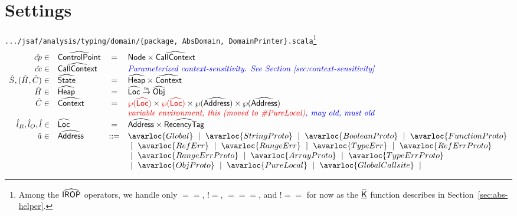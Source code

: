 \newpage
\section{Settings}
{\inblue\tt .../jsaf/analysis/typing/domain/\{package, AbsDomain, DomainPrinter\}.scala}\footnote{
Among the $\widehat{\mbox{\textsf{IROP}}}$ operators, we handle only $==$, $!=$, $===$, and $!==$
for now as the $\widehat{\underline{\sf K}}$ function describes in Section~\ref{sec:abs-helper}.}\\
\[
\begin{array}{rlcl}
\acp \in & \aControlPoint & = & \SF{Node} \times \abs{CallContext} \\
\hat{cc} \in & \abs{CallContext} &  & \comment{\inblue  Parameterized context-sensitivity. See Section~\ref{sec:context-sensitivity}} \\ 
\hat{S}, (\hat{H},\hat{C}) \in & \aState & = & \aHeap \times \abs{Context}\\
\hat{H} \in & \aHeap & = & \aLoc \finto \aObj \\
\hat{C} \in & \abs{Context} & = & {\inred \powerset{\aLoc}} \times {\inred \powerset{\aLoc}} \times \powerset{\abs{Address}} \times \powerset{\abs{Address}} \\
            &               &   & \comment{\inblue {\inred variable environment,\ this (moved to \#PureLocal)},\ may old,\ must old} \\
\hat{l}_R,\hat{l}_O,\hat{l} \in & \aLoc &  = & \abs{Address} \times \abs{RecencyTag}\\
\hat{a} \in & \abs{Address} & ::= & \avarloc{Global} ~\mid~ 
                           \avarloc{StringProto} ~\mid~ 
                           \avarloc{BooleanProto} ~\mid~ 
                           \avarloc{FunctionProto} \\
                    & & & ~\mid~ 
                           \avarloc{RefErr} ~\mid~ 
                           \avarloc{RangeErr} ~\mid~ 
                           \avarloc{TypeErr} ~\mid~ 
                           \avarloc{RefErrProto}  \\
                    & & & ~\mid~ 
                           \avarloc{RangeErrProto} ~\mid~ 
                           \avarloc{ArrayProto} ~\mid~ 
                           \avarloc{TypeErrProto} \\
                    & & & ~\mid~ 
                           \avarloc{ObjProto} ~\mid~ 
                           \avarloc{PureLocal} ~\mid~ 
                           \avarloc{GlobalCallsite} ~\mid~ 

\end{array}\]
